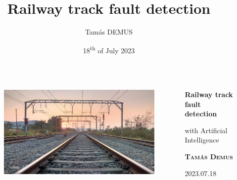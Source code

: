 \documentclass[aspectratio=169]{beamer}
\title{Railway track fault detection}
\author{Tamás DEMUS}
\date{18\textsuperscript{th} of July 2023}
\begin{document}
\begin{frame}
    \thispagestyle{empty}
    \begin{columns}
        \begin{column}{0.4\textwidth}
            \begin{figure}[H]
                \raggedleft
                \includegraphics[width=\textwidth]{./tex_images/rail_track.jpg}
            \end{figure}
        \end{column}

        \begin{column}{0.5\textwidth}
            {\Large\textbf{Railway track fault detection}}

            with Artificial Intelligence

            \vspace*{0.5cm}
            \textbf{\textsc{Tamás Demus}}

            {\small 2023.07.18}
        \end{column}
    \end{columns}
\end{frame}
\end{document}
